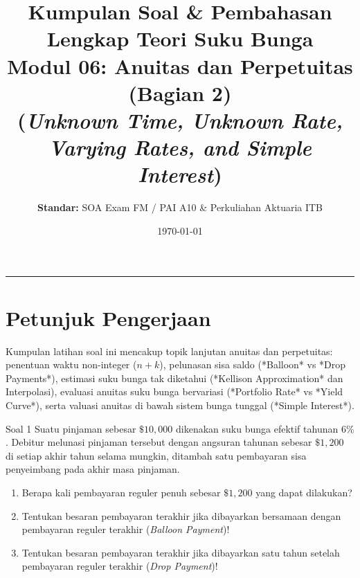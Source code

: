 \documentclass[11pt,a4paper]{article}
\title{\textbf{\LARGE Kumpulan Soal \& Pembahasan Lengkap Teori Suku Bunga}\\[0.3em]
\Large Modul 06: Anuitas dan Perpetuitas (Bagian 2)\\
\large (\textit{Unknown Time, Unknown Rate, Varying Rates, and Simple Interest})}
\author{\textbf{Standar:} SOA Exam FM / PAI A10 \& Perkuliahan Aktuaria ITB}
\date{\today}
\begin{document}
\maketitle
\noindent\rule{\textwidth}{0.4pt}
\vspace{1em}

\section*{Petunjuk Pengerjaan}
Kumpulan latihan soal ini mencakup topik lanjutan anuitas dan perpetuitas: penentuan waktu non-integer ($n+k$), pelunasan sisa saldo (*Balloon* vs *Drop Payments*), estimasi suku bunga tak diketahui (*Kellison Approximation* dan Interpolasi), evaluasi anuitas suku bunga bervariasi (*Portfolio Rate* vs *Yield Curve*), serta valuasi anuitas di bawah sistem bunga tunggal (*Simple Interest*).

\vspace{1em}

\begin{problembox}{Soal 1}
Suatu pinjaman sebesar $\$10{,}000$ dikenakan suku bunga efektif tahunan $6\%$. Debitur melunasi pinjaman tersebut dengan angsuran tahunan sebesar $\$1{,}200$ di setiap akhir tahun selama mungkin, ditambah satu pembayaran sisa penyeimbang pada akhir masa pinjaman.
\begin{enumerate}[label=(\alph*)]
    \item Berapa kali pembayaran reguler penuh sebesar $\$1{,}200$ yang dapat dilakukan?
    \item Tentukan besaran pembayaran terakhir jika dibayarkan bersamaan dengan pembayaran reguler terakhir (\textit{Balloon Payment})!
    \item Tentukan besaran pembayaran terakhir jika dibayarkan satu tahun setelah pembayaran reguler terakhir (\textit{Drop Payment})!
\end{enumerate}
\end{problembox}
\end{document}
